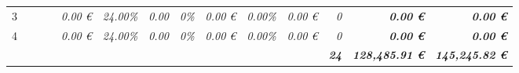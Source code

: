 \begin{table}[]
\begin{tabular}{cllllrrrrrrrrrr}
3                                                                                       & \multicolumn{2}{l}{\cellcolor[HTML]{FFFF99}\textit{}}                                                        & \cellcolor[HTML]{FFFF99}              & \cellcolor[HTML]{FFFF99}                     & \cellcolor[HTML]{FFFF99}\textit{0.00 €}                                              & \textit{24.00\%}                                          & \textit{0.00}                                            & \cellcolor[HTML]{FFFF99}\textit{0\%}                                  & \cellcolor[HTML]{92D050}\textit{0.00 €}                               & \cellcolor[HTML]{FFFF99}\textit{0.00\%}                                & \cellcolor[HTML]{92D050}\textit{0.00 €}                                     & \cellcolor[HTML]{FFFF99}\textit{0}                                            & \cellcolor[HTML]{BFBFBF}\textit{\textbf{0.00 €}}                         & \textit{\textbf{0.00 €}}                                                             \\
4                                                                                       & \multicolumn{2}{l}{\cellcolor[HTML]{FFFF99}\textit{}}                                                        & \cellcolor[HTML]{FFFF99}              & \cellcolor[HTML]{FFFF99}                     & \cellcolor[HTML]{FFFF99}\textit{0.00 €}                                              & \textit{24.00\%}                                          & \textit{0.00}                                            & \cellcolor[HTML]{FFFF99}\textit{0\%}                                  & \cellcolor[HTML]{92D050}\textit{0.00 €}                               & \cellcolor[HTML]{FFFF99}\textit{0.00\%}                                & \cellcolor[HTML]{92D050}\textit{0.00 €}                                     & \cellcolor[HTML]{FFFF99}\textit{0}                                            & \cellcolor[HTML]{BFBFBF}\textit{\textbf{0.00 €}}                         & \textit{\textbf{0.00 €}}                                                             \\
\rowcolor[HTML]{0070C0} 
\multicolumn{1}{l}{\cellcolor[HTML]{0070C0}{\color[HTML]{FFFFFF} \textbf{Gesamtsumme}}} & \multicolumn{2}{l}{\cellcolor[HTML]{0070C0}\textit{}}                                                        &                                       &                                              & \multicolumn{1}{l}{\cellcolor[HTML]{0070C0}\textit{}}                                & \multicolumn{1}{l}{\cellcolor[HTML]{0070C0}\textit{}}     & \multicolumn{1}{l}{\cellcolor[HTML]{0070C0}\textit{}}    & \multicolumn{1}{l}{\cellcolor[HTML]{0070C0}\textit{}}                 & \multicolumn{1}{l}{\cellcolor[HTML]{0070C0}\textit{}}                 & \multicolumn{1}{l}{\cellcolor[HTML]{0070C0}\textit{}}                  & \multicolumn{1}{l}{\cellcolor[HTML]{0070C0}\textit{}}                       & {\color[HTML]{FFFFFF} \textit{\textbf{24}}}                                   & {\color[HTML]{FFFFFF} \textit{\textbf{128,485.91 €}}}                    & {\color[HTML]{FFFFFF} \textit{\textbf{145,245.82 €}}}                                \\

\end{tabular}
\end{table}
